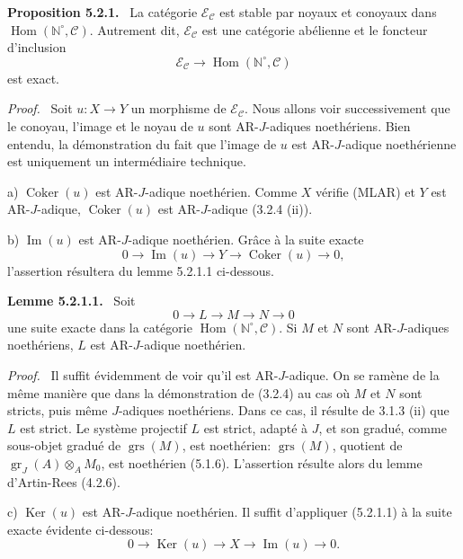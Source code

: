 \documentclass[11pt]{article}
\newenvironment{statement}[1]{\par\medskip\noindent\textbf{#1.}\ }{\par\medskip}
\newenvironment{prooftext}[1][Proof]{\par\noindent\emph{#1.}\ }{\par\medskip}
\DeclareMathOperator{\Hom}{Hom}
\providecommand{\Ker}{\operatorname{Ker}}
\providecommand{\Coker}{\operatorname{Coker}}
\providecommand{\gr}{\operatorname{gr}}
\providecommand{\Hom}{\operatorname{Hom}}
\providecommand{\Im}{\operatorname{Im}}
\providecommand{\Ker}{\operatorname{Ker}}
\providecommand{\Coker}{\operatorname{Coker}}
\providecommand{\gr}{\operatorname{gr}}
\renewcommand{\Im}{\operatorname{Im}}
\providecommand{\gr}{\operatorname{gr}}
\providecommand{\grs}{\operatorname{grs}}
\providecommand{\Ker}{\operatorname{Ker}}
\providecommand{\Coker}{\operatorname{Coker}}
\providecommand{\Im}{\operatorname{Im}}
\begin{document}
\begin{statement}{Proposition 5.2.1}
La catégorie \(\mathcal E_{\mathcal C}\) est stable par noyaux et conoyaux dans \(\Hom(\mathbb N^\circ,\mathcal C)\). Autrement dit, \(\mathcal E_{\mathcal C}\) est une catégorie abélienne et le foncteur d'inclusion
\[
\mathcal E_{\mathcal C}\longrightarrow \Hom(\mathbb N^\circ,\mathcal C)
\]
est exact.
\end{statement}

\begin{prooftext}
Soit \(u:X\to Y\) un morphisme de \(\mathcal E_{\mathcal C}\). Nous allons voir successivement que le conoyau, l'image et le noyau de \(u\) sont AR-\(J\)-adiques noethériens. Bien entendu, la démonstration du fait que l'image de \(u\) est AR-\(J\)-adique noethérienne est uniquement un intermédiaire technique.

a) \(\Coker(u)\) est AR-\(J\)-adique noethérien. Comme \(X\) vérifie (MLAR) et \(Y\) est AR-\(J\)-adique, \(\Coker(u)\) est AR-\(J\)-adique (3.2.4 (ii)).

b) \(\Im(u)\) est AR-\(J\)-adique noethérien. Grâce à la suite exacte
\[
0\longrightarrow \Im(u)\longrightarrow Y\longrightarrow \Coker(u)\longrightarrow 0,
\]
l'assertion résultera du lemme 5.2.1.1 ci-dessous.
\end{prooftext}

\begin{statement}{Lemme 5.2.1.1}
Soit
\[
0\longrightarrow L\longrightarrow M\longrightarrow N\longrightarrow0
\]
une suite exacte dans la catégorie \(\Hom(\mathbb N^\circ,\mathcal C)\). Si \(M\) et \(N\) sont AR-\(J\)-adiques noethériens, \(L\) est AR-\(J\)-adique noethérien.
\end{statement}

\begin{prooftext}
Il suffit évidemment de voir qu'il est AR-\(J\)-adique. On se ramène de la même manière que dans la démonstration de (3.2.4) au cas où \(M\) et \(N\) sont stricts, puis même \(J\)-adiques noethériens. Dans ce cas, il résulte de 3.1.3 (ii) que \(L\) est strict. Le système projectif \(L\) est strict, adapté à \(J\), et son gradué, comme sous-objet gradué de \(\grs(M)\), est noethérien: \(\grs(M)\), quotient de \(\gr_J(A)\otimes_A M_0\), est noethérien (5.1.6). L'assertion résulte alors du lemme d'Artin-Rees (4.2.6).
\end{prooftext}

c) \(\Ker(u)\) est AR-\(J\)-adique noethérien. Il suffit d'appliquer (5.2.1.1) à la suite exacte évidente ci-dessous:
\[
0\longrightarrow \Ker(u)\longrightarrow X\longrightarrow \Im(u)\longrightarrow0.
\]
\end{document}
